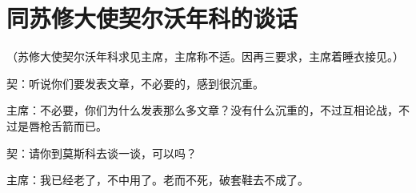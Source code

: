 \section[同苏修大使契尔沃年科的谈话（一九六三年二月二十三日）]{同苏修大使契尔沃年科的谈话}


（苏修大使契尔沃年科求见主席，主席称不适。因再三要求，主席着睡衣接见。）

契：听说你们要发表文章，不必要的，感到很沉重。

主席：不必要，你们为什么发表那么多文章？没有什么沉重的，不过互相论战，不过是唇枪舌箭而已。

契：请你到莫斯科去谈一谈，可以吗？

主席：我已经老了，不中用了。老而不死，破套鞋去不成了。


